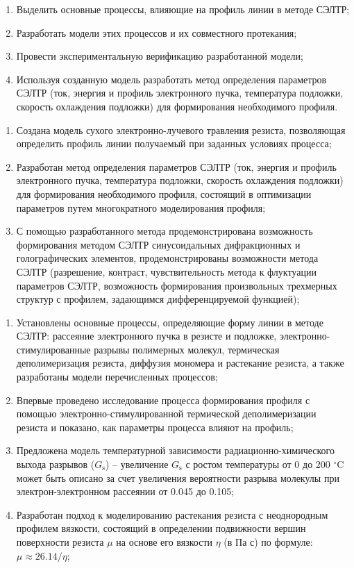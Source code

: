 \begin{enumerate}
	\item Выделить основные процессы, влияющие на профиль линии в методе СЭЛТР;
	\item Разработать модели этих процессов и их совместного протекания;
	\item Провести экспериментальную верификацию разработанной модели;
	\item Используя созданную модель разработать метод определения параметров СЭЛТР (ток, энергия и профиль электронного пучка, температура подложки, скорость охлаждения подложки) для формирования необходимого профиля.
\end{enumerate}



\begin{enumerate}
	\item Создана модель сухого электронно-лучевого травления резиста, позволяющая определить профиль линии получаемый при заданных условиях процесса;
	\item Разработан метод определения параметров СЭЛТР (ток, энергия и профиль электронного пучка, температура подложки, скорость охлаждения подложки) для формирования необходимого профиля, состоящий в оптимизации параметров путем многократного моделирования профиля;
	\item С помощью разработанного метода продемонстрирована возможность формирования методом СЭЛТР синусоидальных дифракционных и голографических элементов, продемонстрированы возможности метода СЭЛТР (разрешение, контраст, чувствительность метода к флуктуации параметров СЭЛТР, возможность формирования произвольных трехмерных структур с профилем, задающимся дифференцируемой функцией);
\end{enumerate}


\novelty

\begin{enumerate}
	\item Установлены основные процессы, определяющие форму линии в методе СЭЛТР: рассеяние электронного пучка в резисте и подложке, электронно-стимулированные разрывы полимерных молекул, термическая деполимеризация резиста, диффузия мономера и растекание резиста, а также разработаны модели перечисленных процессов;
	\item Впервые проведено исследование процесса формирования профиля с помощью электронно-стимулированной термической деполимеризации резиста и показано, как параметры процесса влияют на профиль;
	\item Предложена модель температурной зависимости радиационно-химического выхода разрывов ($G_\mathrm{s}$) -- увеличение $G_\mathrm{s}$ с ростом температуры от 0 до 200 $^\circ$C может быть описано за счет увеличения вероятности разрыва молекулы при электрон-электронном рассеянии от 0.045 до 0.105;
	\item Разработан подход к моделированию растекания резиста с неоднородным профилем вязкости, состоящий в определении подвижности вершин поверхности резиста $\mu$ на основе его вязкости $\eta$ (в Па с) по формуле: $\mu \approx 26.14 / \eta$;
\end{enumerate}


